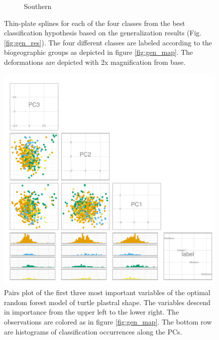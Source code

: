 \documentclass[12pt,letterpaper]{article}\usepackage{graphicx, color}
\begin{document}
\begin{figure}[ht]
\begin{subfigure}[b]{0.4\textwidth}
    \caption{Southern}
    \label{fig:mean_shape4}
  \end{subfigure}
  \caption{Thin-plate splines for each of the four classes from the best classification hypothesis based on the generalization results (Fig. \ref{fig:gen_res}). The four different classes are labeled according to the biogeographic groups as depicted in figure \ref{fig:gen_map}. The deformations are depicted with 2x magnification from base.}
  \label{fig:mean_shape}
\end{figure}

\begin{figure}[ht]
  \centering
  \includegraphics[width = \textwidth]{figure/pca_imp}
  \caption{Pairs plot of the first three most important variables of the optimal random forest model of turtle plastral shape. The variables descend in importance from the upper left to the lower right. The observations are colored as in figure \ref{fig:gen_map}.  The bottom row are histograms of classification occurrences along the PCs.}
  \label{fig:imp_pc}
\end{figure}
\end{document}
